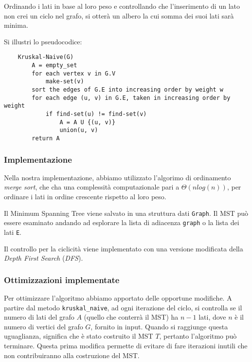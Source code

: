 Ordinando i lati in base al loro peso e controllando che l'inserimento
di un lato non crei un ciclo nel grafo, si otterà un albero la cui
somma dei suoi lati sarà minima.

Si illustri lo pseudocodice:
\begin{verbatim}
    Kruskal-Naive(G)
        A = empty_set
        for each vertex v in G.V
            make-set(v)
        sort the edges of G.E into increasing order by weight w
        for each edge (u, v) in G.E, taken in increasing order by weight
            if find-set(u) != find-set(v)
                A = A U {(u, v)}
                union(u, v)
        return A
\end{verbatim}

\subsubsection{Implementazione}

Nella nostra implementazione, abbiamo utilizzato l'algorimo di
ordinamento \textit{merge sort}, che cha una complessità
computazionale pari a $\Theta(n log(n))$, per ordinare i lati
in ordine crescente rispetto al loro peso.

Il Minimum Spanning Tree viene salvato in una struttura dati
\verb|Graph|. Il MST può essere esaminato andando ad
esplorare la lista di adiacenza \verb|graph| o la lista dei
lati \verb|E|.

Il controllo per la ciclicità viene implementato con una
versione modificata della \textit{Depth First Search}
(\textit{DFS}).

\subsubsection{Ottimizzazioni implementate}

Per ottimizzare l'algoritmo abbiamo apportato delle opportune
modifiche. A partire dal metodo \verb|kruskal_naive|, ad
ogni iterazione del ciclo, si controlla se il numero di lati
del grafo $A$ (quello che conterrà il MST) ha $n - 1$ lati,
dove $n$ è il numero di vertici del grafo $G$, fornito in input.
Quando si raggiunge questa uguaglianza, significa che è stato
costruito il MST $T$, pertanto l'algoritmo può terminare.
Questa prima modifica permette di evitare di fare iterazioni
inutili che non contribuiranno alla costruzione del MST.

